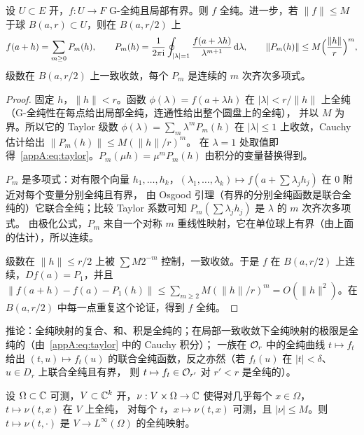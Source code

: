 \begin{theorem}\label{appA:thm:G-hol}
设 $U\subset E$ 开，$f:U\to F$ G-全纯且局部有界。则 $f$ 全纯。进一步，若 $\|f\|\le M$ 于球 $B(a,r)\subset U$，则在 $B(a,r/2)$ 上
\begin{equation}\label{appA:eq:taylor}
  f(a+h)=\sum_{m\ge0}P_m(h),\qquad P_m(h)=\frac1{2\pi\mathrm{i}}\oint_{|\lambda|=1}\frac{f(a+\lambda h)}{\lambda^{m+1}}\,\mathrm{d}\lambda,\qquad \|P_m(h)\|\le M\Bigl(\frac{\|h\|}{r}\Bigr)^m ,
\end{equation}
级数在 $B(a,r/2)$ 上一致收敛，每个 $P_m$ 是连续的 $m$ 次齐次多项式。
\end{theorem}

\begin{proof}
固定 $h$，$\|h\|<r$。函数 $\phi(\lambda)=f(a+\lambda h)$ 在 $|\lambda|<r/\|h\|$ 上全纯（G-全纯性在每点给出局部全纯，连通性给出整个圆盘上的全纯），
并以 $M$ 为界。所以它的 Taylor 级数 $\phi(\lambda)=\sum_m\lambda^mP_m(h)$ 在 $|\lambda|\le1$ 上收敛，Cauchy 估计给出 $\|P_m(h)\|\le M(\|h\|/r)^m$。
在 $\lambda=1$ 处取值即得~\eqref{appA:eq:taylor}。$P_m(\mu h)=\mu^mP_m(h)$ 由积分的变量替换得到。

$P_m$ 是多项式：对有限个向量 $h_1,\dots,h_k$，$(\lambda_1,\dots,\lambda_k)\mapsto f(a+\sum\lambda_jh_j)$ 在 $0$ 附近对每个变量分别全纯且有界，
由 Osgood 引理（有界的分别全纯函数是联合全纯的）它联合全纯；比较 Taylor 系数可知 $P_m(\sum\lambda_jh_j)$ 是 $\lambda$ 的 $m$ 次齐次多项式。
由极化公式，$P_m$ 来自一个对称 $m$ 重线性映射，它在单位球上有界（由上面的估计），所以连续。

级数在 $\|h\|\le r/2$ 上被 $\sum M2^{-m}$ 控制，一致收敛。于是 $f$ 在 $B(a,r/2)$ 上连续，$Df(a)=P_1$，并且
$\|f(a+h)-f(a)-P_1(h)\|\le\sum_{m\ge2}M(\|h\|/r)^m=O(\|h\|^2)$。在 $B(a,r/2)$ 中每一点重复这个论证，得到 $f$ 全纯。
\end{proof}

推论：全纯映射的复合、和、积是全纯的；在局部一致收敛下全纯映射的极限是全纯的（由~\eqref{appA:eq:taylor} 中的 Cauchy 积分）；
一族在 $\mathcal O_r$ 中的全纯曲线 $t\mapsto f_t$ 给出 $(t,u)\mapsto f_t(u)$ 的联合全纯函数，反之亦然（若 $f_t(u)$ 在 $|t|<\delta$、$u\in D_r$ 上联合全纯且有界，
则 $t\mapsto f_t\in\mathcal O_{r'}$ 对 $r'<r$ 是全纯的）。

\begin{proposition}\label{appA:prop:Linfty}
设 $\Omega\subset\mathbb{C}$ 可测，$V\subset\mathbb{C}^k$ 开，$\nu:V\times\Omega\to\mathbb{C}$ 使得对几乎每个 $x\in\Omega$，$t\mapsto\nu(t,x)$ 在 $V$ 上全纯，
对每个 $t$，$x\mapsto\nu(t,x)$ 可测，且 $|\nu|\le M$。则 $t\mapsto\nu(t,\cdot)$ 是 $V\to L^\infty(\Omega)$ 的全纯映射。
\end{proposition}

